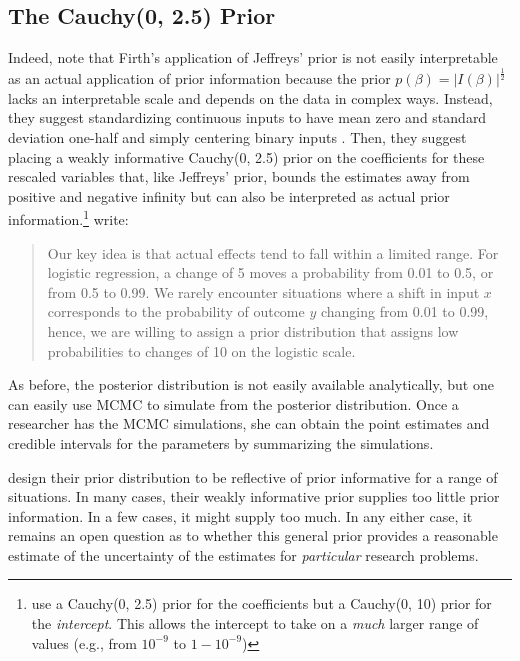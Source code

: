 \documentclass[12pt]{article}
\begin{document}
\subsection*{The Cauchy(0, 2.5) Prior}

Indeed, \cite{Gelmanetal2008} note that Firth's application of Jeffreys' prior is not easily interpretable as an actual application of prior information because the prior $p(\beta) = |I(\beta)|^\frac{1}{2}$ lacks an interpretable scale and depends on the data in complex ways. Instead, they suggest standardizing continuous inputs to have mean zero and standard deviation one-half and simply centering binary inputs \citep{Gelman2008}. Then, they suggest placing a weakly informative Cauchy(0, 2.5) prior on the coefficients for these rescaled variables that, like Jeffreys' prior, bounds the estimates away from positive and negative infinity but can also be interpreted as actual prior information.\footnote{\cite{Gelmanetal2008} use a Cauchy(0, 2.5) prior for the coefficients but a Cauchy(0, 10) prior for the \emph{intercept}. This allows the intercept to take on a \emph{much} larger range of values (e.g., from $10^{-9}$ to $1 - 10^{-9}$)} \citet[p. 1363]{Gelmanetal2008} write:
\begin{quote}
Our key idea is that actual effects tend to fall within a limited range. For logistic regression, a change of 5 moves a probability from 0.01 to 0.5, or from 0.5 to 0.99. We rarely encounter situations where a shift in input $x$ corresponds to the probability of outcome $y$ changing from 0.01 to 0.99, hence, we are willing to assign a prior distribution that assigns low probabilities to changes of 10 on the logistic scale.
\end{quote}

As before, the posterior distribution is not easily available analytically, but one can easily use MCMC to simulate from the posterior distribution. Once a researcher has the MCMC simulations, she can obtain the point estimates and credible intervals for the parameters by summarizing the simulations. 

\cite{Gelmanetal2008} design their prior distribution to be reflective of prior informative for a range of situations. In many cases, their weakly informative prior supplies too little prior information. In a few cases, it might supply too much. In any either case, it remains an open question as to whether this general prior provides a reasonable estimate of the uncertainty of the estimates for \emph{particular} research problems.
\end{document}
